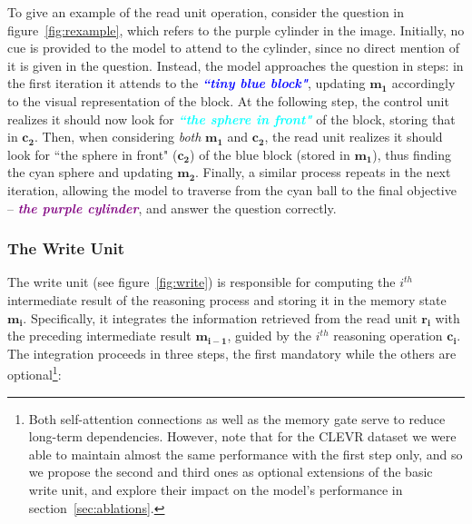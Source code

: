 \documentclass[fleqn]{article}
\newcommand{\figref}[1]{figure~\ref{fig:#1}}
\newcommand{\secref}[1]{section~\ref{sec:#1}}
\begin{document}
To give an example of the read unit operation, consider the question in \figref{rexample}, which refers to the purple cylinder in the image. Initially, no cue is provided to the model to attend to the cylinder, since no direct mention of it is given in the question. Instead, the model approaches the question in steps: in the first iteration it attends to the \textcolor{blue}{\textit{\textbf{``tiny blue block"}}}, updating \(\boldsymbol{m_1}\) accordingly to the visual representation of the block. At the following step, the control unit realizes it should now look for \textcolor{cyan}{\textit{\textbf{``the sphere in front"}}} of the block, storing that in \(\boldsymbol{c_2}\). Then, when considering \textit{both} \(\boldsymbol{m_1}\) and \(\boldsymbol{c_2}\), the read unit realizes it should look for ``the sphere in front" (\(\boldsymbol{c_2}\)) of the blue block (stored in \(\boldsymbol{m_1}\)), thus finding the cyan sphere and updating \(\boldsymbol{m_2}\). Finally, a similar process repeats in the next iteration, allowing the model to traverse from the cyan ball to the final objective -- \textcolor{purple}{\textit{\textbf{the purple cylinder}}}, and answer the question correctly.

\newpage
\subsubsection{The Write Unit}
\label{sec:WU}
The write unit (see \figref{write}) is responsible for computing the \(i^{th}\) intermediate result of the reasoning process and storing it in the memory state \(\boldsymbol{m_i}\). Specifically, it integrates the information retrieved from the read unit \(\boldsymbol{r_i}\) with the preceding intermediate result \(\boldsymbol{m_{i-1}}\), guided by the \(i^{th}\) reasoning operation \(\boldsymbol{c_i}\). The integration proceeds in three steps, the first mandatory while the others are optional\footnote{Both self-attention connections as well as the memory gate serve to reduce long-term dependencies. However, note that for the CLEVR dataset we were able to maintain almost the same performance with the first step only, and so we propose the second and third ones as optional extensions of the basic write unit, and explore their impact on the model's performance in \secref{ablations}.}:
\end{document}
